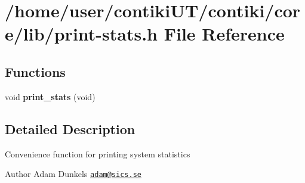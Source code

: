 \hypertarget{print-stats_8h}{}\section{/home/user/contiki\+U\+T/contiki/core/lib/print-\/stats.h File Reference}
\label{print-stats_8h}
\subsection*{Functions}
\begin{DoxyCompactItemize}
\item 
\hypertarget{print-stats_8h_a3cfd081470c98af274220427883690c2}{}void {\bfseries print\+\_\+stats} (void)\label{print-stats_8h_a3cfd081470c98af274220427883690c2}

\end{DoxyCompactItemize}


\subsection{Detailed Description}
Convenience function for printing system statistics \begin{DoxyAuthor}{Author}
Adam Dunkels \href{mailto:adam@sics.se}{\tt adam@sics.\+se} 
\end{DoxyAuthor}
